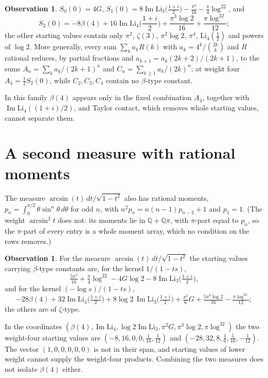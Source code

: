 \documentclass[11pt]{article}
\theoremstyle{definition}
\newtheorem{observation}[theorem]{Observation}
\begin{document}
\begin{observation}\label{obs:arcsine}
$S_0(0)=4G$, $S_1(0)=8\operatorname{Im}\mathrm{Li}_3\big(\tfrac{1+i}{2}\big)-\tfrac{\pi^3}{16}-\tfrac{\pi}{4}\log^22$, and
\[
S_2(0)=-8\beta(4)+16\operatorname{Im}\mathrm{Li}_4\Big(\frac{1+i}{2}\Big)+\frac{\pi^3\log2}{16}+\frac{\pi\log^32}{12};
\]
the other starting values contain only $\pi^2$, $\zeta(3)$, $\pi^2\log2$, $\pi^4$, $\mathrm{Li}_4(\tfrac12)$ and powers of $\log 2$. More generally, every sum $\sum_ka_kR(k)$ with $a_k=4^k/\binom{2k}{k}$ and $R$ rational reduces, by partial fractions and $a_{k+1}=a_k(2k+2)/(2k+1)$, to the sums $A_n=\sum_ka_k/(2k+1)^n$ and $C_n=\sum_{k\ge1}a_k/(2k)^n$; at weight four $A_4=\frac12S_2(0)$, while $C_2,C_3,C_4$ contain no $\beta$-type constant.
\end{observation}

In this family $\beta(4)$ appears only in the fixed combination $A_4$, together with $\operatorname{Im}\mathrm{Li}_4((1+i)/2)$, and Taylor contact, which removes whole starting values, cannot separate them.

\section{A second measure with rational moments}\label{sec:second}

The measure $\arcsin(t)\,dt/\sqrt{1-t^2}$ also has rational moments, $p_n=\int_0^{\pi/2}\theta\sin^n\theta\,d\theta$ for odd $n$, with $n^2p_n=n(n-1)p_{n-2}+1$ and $p_1=1$. (The weight $\arcsin^2t$ does not: its moments lie in $\mathbb Q+\mathbb Q\pi$, with $\pi$-part equal to $p_n$, so the $\pi$-part of every entry is a whole moment array, which no condition on the rows removes.)

\begin{observation}\label{obs:second}
For the measure $\arcsin(t)\,dt/\sqrt{1-t^2}$ the starting values carrying $\beta$-type constants are, for the kernel $1/(1-ts)$,
\[
\tfrac{5\pi^3}{16}+\tfrac{\pi}{4}\log^22-4G\log2-8\operatorname{Im}\mathrm{Li}_3\big(\tfrac{1+i}{2}\big),
\]
and for the kernel $(-\log s)/(1-ts)$,
\[
-28\beta(4)+32\operatorname{Im}\mathrm{Li}_4\big(\tfrac{1+i}{2}\big)+8\log2\,\operatorname{Im}\mathrm{Li}_3\big(\tfrac{1+i}{2}\big)+\tfrac{\pi^2}{6}G+\tfrac{5\pi^3\log2}{16}-\tfrac{\pi\log^32}{12};
\]
the others are of $\zeta$-type.
\end{observation}

In the coordinates $(\beta(4),\operatorname{Im}\mathrm{Li}_4,\log2\operatorname{Im}\mathrm{Li}_3,\pi^2G,\pi^3\log2,\pi\log^32)$ the two weight-four starting values are $(-8,16,0,0,\tfrac1{16},\tfrac1{12})$ and $(-28,32,8,\tfrac16,\tfrac5{16},-\tfrac1{12})$. The vector $(1,0,0,0,0,0)$ is not in their span, and starting values of lower weight cannot supply the weight-four products. Combining the two measures does not isolate $\beta(4)$ either.
\end{document}
